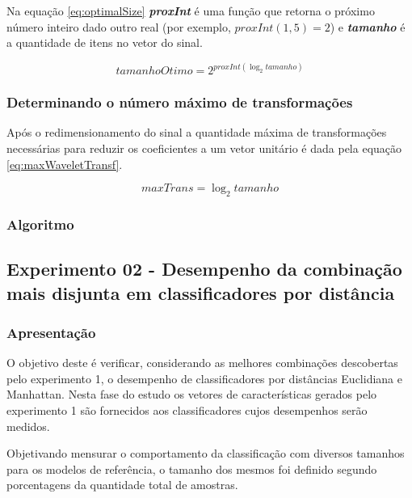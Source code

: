				\par Na equação \ref{eq:optimalSize} \textit{\textbf{proxInt}} é uma função que retorna o próximo número inteiro dado outro real (por exemplo, $proxInt(1,5) = 2$) e \textit{\textbf{tamanho}} é a quantidade de itens no vetor do sinal.

				\begin{equation}
					tamanhoOtimo=2^{proxInt(\log_{2}tamanho)}
					\label{eq:optimalSize}
				\end{equation} 
			
			\subsubsection{Determinando o número máximo de transformações}
				\par Após o redimensionamento do sinal a quantidade máxima de transformações necessárias para reduzir os coeficientes a um vetor unitário é dada pela equação \ref{eq:maxWaveletTransf}. 
				
				\begin{equation}
					maxTrans=\log_{2}tamanho
					\label{eq:maxWaveletTransf}
				\end{equation}


			\subsubsection{Algoritmo}
			

		\subsection{Experimento 02 - Desempenho da combinação mais disjunta em classificadores por distância}
		\label{chap:propApproach:sec:Experimento02}
			\subsubsection{Apresentação}
				\par O objetivo deste é verificar, considerando as melhores combinações descobertas pelo experimento 1, o desempenho de classificadores por distâncias Euclidiana e Manhattan. Nesta fase do estudo os vetores de características gerados pelo experimento 1 são fornecidos aos classificadores cujos desempenhos serão medidos.
				
				\par Objetivando mensurar o comportamento da classificação com diversos tamanhos para os modelos de referência, o tamanho dos mesmos foi definido segundo porcentagens da quantidade total de amostras.
				
